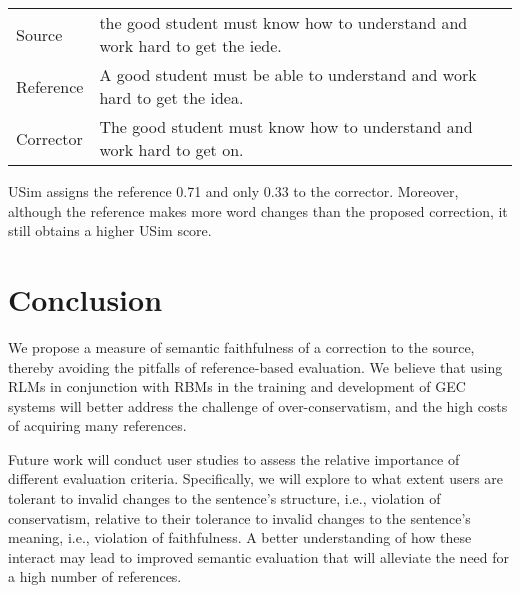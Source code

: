 \documentclass[a4paper, 11pt]{article}
\begin{document}
\begin{table}[h!]
  \centering
  \label{ex:sensitive}
  \begin{tabular}{p{}p{}}
    Source    & \small the good student must know how to understand and work hard to get the iede.\\
    Reference & \small A good student must be able to understand and work hard to get the idea.\\
    Corrector & \small The good student must know how to understand and work hard to get on.     
  \end{tabular}
  
\end{table}

{\sc USim} assigns the reference 0.71 and only 0.33 to the corrector.
Moreover, although the reference makes more word changes than the proposed correction,
it still obtains a higher {\sc USim} score.


%
%
%

\section{Conclusion}

We propose a measure of semantic faithfulness of a correction to the source,
thereby avoiding the pitfalls of reference-based evaluation. 
We believe that using RLMs in conjunction with RBMs in the training and development of GEC
systems will better address the challenge of over-conservatism, and the 
high costs of acquiring many references.

Future work will conduct user studies to assess the relative importance
of different evaluation criteria.
Specifically, we will explore to what extent users are
tolerant to invalid changes to the sentence's structure, i.e.,
violation of conservatism, relative to their tolerance to invalid changes 
to the sentence's meaning, i.e., violation of faithfulness.
A better understanding of how these interact
may lead to improved semantic evaluation that will alleviate the need
for a high number of references.




\end{document}
